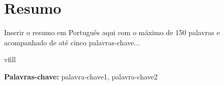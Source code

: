 
\section*{Resumo}


Inserir o resumo em Português aqui com o máximo de 150 palavras e acompanhado de até cinco palavras-chave...

vfill

\textbf{\Large Palavras-chave:} palavra-chave1, palavra-chave2

